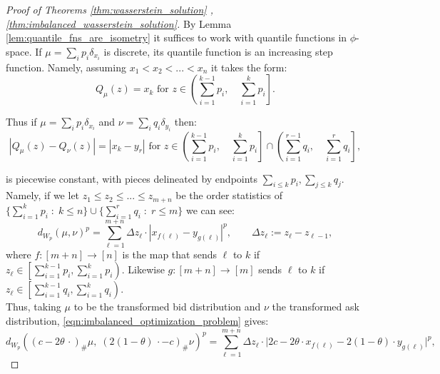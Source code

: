 \begin{proof}[Proof of Theorems \ref{thm:wasserstein_solution} ,\ref{thm:imbalanced_wasserstein_solution}]
    \label{proof:imbalanced_wasserstein_solution}
    By Lemma \ref{lem:quantile_fns_are_isometry} it suffices to work with quantile functions in $\phi$-space. If $\mu = \sum_i p_i \delta_{x_i}$ is discrete, its quantile function is an increasing step function. Namely, assuming $x_1 < x_2 < ... < x_n$ it takes the form:
%
\[Q_\mu(z) = x_k \text{  for  } z\in \left(\sum_{i=1}^{k-1} p_i, \quad \sum_{i=1}^k p_i \right]. \]
%

\noindent Thus if $\mu = \sum_i p_i \delta_{x_i}$ and $\nu = \sum_i q_i \delta_{y_i}$ then:
%
\[|Q_\mu(z) - Q_\nu(z)| = |x_k - y_r| \text{ for } z \in \left(\sum_{i=1}^{k-1} p_i, \quad \sum_{i=1}^k p_i \right] \cap \left(\sum_{i=1}^{r-1} q_i, \quad \sum_{i=1}^r q_i \right],\]

\noindent is piecewise constant, with pieces delineated by endpoints $\sum_{i \leq k} p_i, \sum_{j \leq k} q_j$. Namely, if we let $z_1 \leq z_2 \leq ... \leq z_{m+n}$ be the order statistics of $\{\sum_{i=1}^{k} p_i \; : \; k \leq n\} \cup \{\sum_{i=1}^{r} q_i \; : \; r \leq m\}$ we can see:
%
\[d_{W_p}(\mu, \nu)^p = \sum_{\ell = 1}^{m+n} \Delta z_\ell \cdot | x_{f(\ell)} - y_{g(\ell)}|^p, \qquad \Delta z_\ell := z_\ell - z_{\ell - 1},\]
%
\noindent where $f:[m+n] \to [n]$ is the map that sends $\ell$ to $k$ if $z_\ell \in \left[\sum_{i=1}^{k-1} p_i,  \sum_{i=1}^k p_i \right)$. Likewise $g : [m+n] \to [m]$ sends $\ell$ to $k$ if $z_\ell \in \left[\sum_{i=1}^{k-1} q_i,  \sum_{i=1}^k q_i \right)$.\\


\noindent Thus, taking $\mu$ to be the transformed bid distribution and $\nu$ the transformed ask distribution, \eqref{eqn:imbalanced_optimization_problem} gives:
%
\begin{equation}
    d_{W_p}\left((c-2\theta\,\cdot)_\#\mu, \; (2(1-\theta)\,\cdot-c)_\#\nu \right)^p = \sum_{\ell = 1}^{m+n} \Delta z_\ell \cdot \Big|2c-2\theta \cdot x_{f(\ell)} - 2(1-\theta) \cdot y_{g(\ell)}\Big|^p,
\end{equation}
%


\end{proof}
